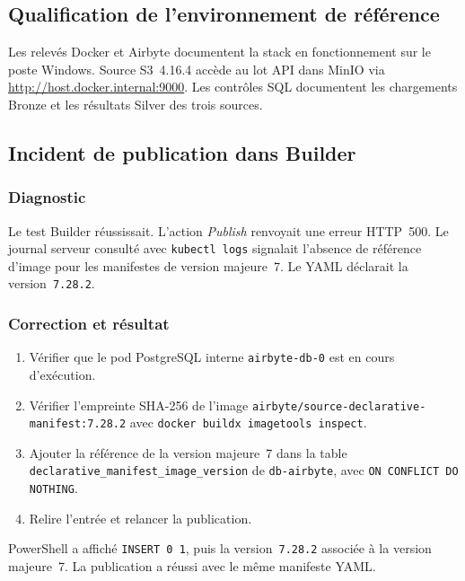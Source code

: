 \documentclass[11pt,a4paper]{article}
\newcommand{\code}[1]{\texttt{#1}}
\begin{document}
\subsection{Qualification de l'environnement de référence}

Les relevés Docker et Airbyte documentent la stack en fonctionnement
sur le poste Windows. Source S3~4.16.4 accède au lot API dans MinIO via
\url{http://host.docker.internal:9000}. Les contrôles SQL documentent
les chargements Bronze et les résultats Silver des trois sources.

\subsection{Incident de publication dans Builder}

\subsubsection{Diagnostic}

Le test Builder réussissait. L'action \emph{Publish} renvoyait
une erreur HTTP~500. Le journal serveur consulté avec
\code{kubectl logs} signalait l'absence de référence d'image
pour les manifestes de version majeure~7. Le YAML déclarait
la version~\code{7.28.2}.

\subsubsection{Correction et résultat}

\begin{enumerate}
  \item Vérifier que le pod PostgreSQL interne \code{airbyte-db-0}
        est en cours d'exécution.
  \item Vérifier l'empreinte SHA-256 de l'image
        \code{airbyte/source-declarative-manifest:7.28.2}
        avec \code{docker buildx imagetools inspect}.
  \item Ajouter la référence de la version majeure~7 dans la table
        \verb|declarative_manifest_image_version| de \code{db-airbyte},
        avec \code{ON CONFLICT DO NOTHING}.
  \item Relire l'entrée et relancer la publication.
\end{enumerate}

PowerShell a affiché \code{INSERT 0 1}, puis la version~\code{7.28.2}
associée à la version majeure~7. La publication a réussi avec
le même manifeste YAML.
\end{document}
